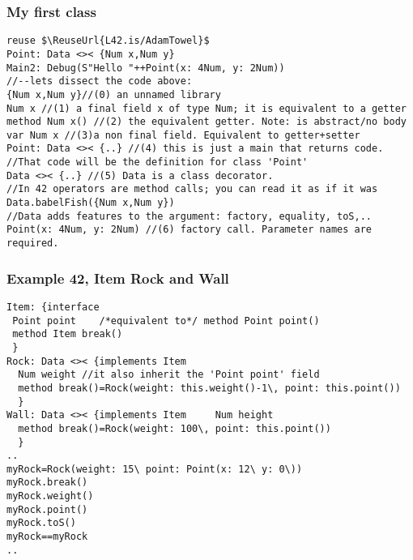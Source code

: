 \begin{frame}[fragile]
\frametitle{My first class}
\begin{NiceCode}{59ex}{0.8}
\begin{lstlisting}
reuse $\ReuseUrl{L42.is/AdamTowel}$
Point: Data <>< {Num x,Num y}
Main2: Debug(S"Hello "++Point(x: 4Num, y: 2Num))
//--lets dissect the code above: 
{Num x,Num y}//(0) an unnamed library
Num x //(1) a final field x of type Num; it is equivalent to a getter
method Num x() //(2) the equivalent getter. Note: is abstract/no body
var Num x //(3)a non final field. Equivalent to getter+setter
Point: Data <>< {..} //(4) this is just a main that returns code.
//That code will be the definition for class 'Point'
Data <>< {..} //(5) Data is a class decorator.
//In 42 operators are method calls; you can read it as if it was
Data.babelFish({Num x,Num y})
//Data adds features to the argument: factory, equality, toS,..
Point(x: 4Num, y: 2Num) //(6) factory call. Parameter names are required.
\end{lstlisting}
\end{NiceCode}
\end{frame}


\begin{frame}[fragile]
\frametitle{Example 42, Item Rock and Wall}
\begin{NiceCode}{59ex}{0.7}
\begin{lstlisting}
Item: {interface
 Point point    /*equivalent to*/ method Point point()
 method Item break()
 }
Rock: Data <>< {implements Item
  Num weight //it also inherit the 'Point point' field
  method break()=Rock(weight: this.weight()-1\, point: this.point())
  }
Wall: Data <>< {implements Item     Num height
  method break()=Rock(weight: 100\, point: this.point())
  }
..
myRock=Rock(weight: 15\ point: Point(x: 12\ y: 0\))
myRock.break()
myRock.weight()
myRock.point()
myRock.toS()
myRock==myRock
..
\end{lstlisting}
\end{NiceCode}
\end{frame}


